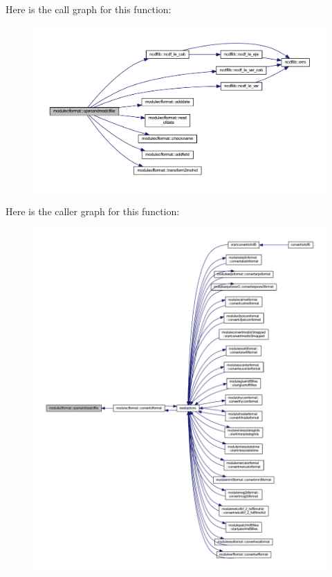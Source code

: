 Here is the call graph for this function\+:\nopagebreak
\begin{figure}[H]
\begin{center}
\leavevmode
\includegraphics[width=350pt]{namespacemodulecfformat_a5052b284bceadda6143b8eb5cfd48d05_cgraph}
\end{center}
\end{figure}
Here is the caller graph for this function\+:\nopagebreak
\begin{figure}[H]
\begin{center}
\leavevmode
\includegraphics[width=350pt]{namespacemodulecfformat_a5052b284bceadda6143b8eb5cfd48d05_icgraph}
\end{center}
\end{figure}
\mbox{\label{namespacemodulecfformat_a369a14cc96dd6826942c93e6352240db}} 

